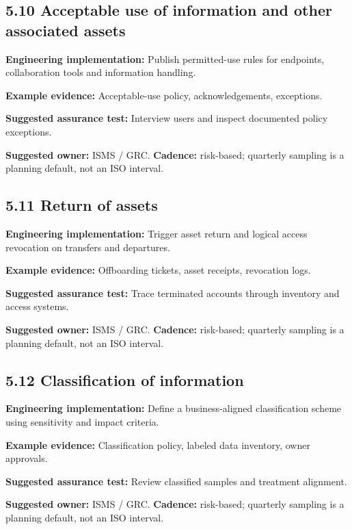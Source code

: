 \documentclass[11pt,letterpaper]{article}
\begin{document}
\subsection{5.10 Acceptable use of information and other associated assets}
\textbf{Engineering implementation:} Publish permitted-use rules for endpoints, collaboration tools and information handling.\par
\textbf{Example evidence:} Acceptable-use policy, acknowledgements, exceptions.\par
\textbf{Suggested assurance test:} Interview users and inspect documented policy exceptions.\par
\textbf{Suggested owner:} ISMS / GRC. \textbf{Cadence:} risk-based; quarterly sampling is a planning default, not an ISO interval.\par
{}
\subsection{5.11 Return of assets}
\textbf{Engineering implementation:} Trigger asset return and logical access revocation on transfers and departures.\par
\textbf{Example evidence:} Offboarding tickets, asset receipts, revocation logs.\par
\textbf{Suggested assurance test:} Trace terminated accounts through inventory and access systems.\par
\textbf{Suggested owner:} ISMS / GRC. \textbf{Cadence:} risk-based; quarterly sampling is a planning default, not an ISO interval.\par
{}
\subsection{5.12 Classification of information}
\textbf{Engineering implementation:} Define a business-aligned classification scheme using sensitivity and impact criteria.\par
\textbf{Example evidence:} Classification policy, labeled data inventory, owner approvals.\par
\textbf{Suggested assurance test:} Review classified samples and treatment alignment.\par
\textbf{Suggested owner:} ISMS / GRC. \textbf{Cadence:} risk-based; quarterly sampling is a planning default, not an ISO interval.\par
{}
\end{document}
